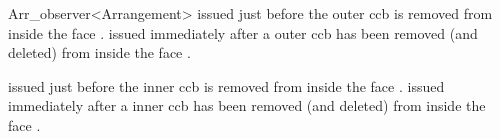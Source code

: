 \begin{ccRefClass}{Arr_observer<Arrangement>}
    {issued just before the outer ccb  is removed from inside the
     face .}
\ccGlue
{}
    {issued immediately after a outer ccb has been removed (and deleted)
     from inside the face .}

    {issued just before the inner ccb  is removed from inside the
     face .}
\ccGlue
{}
    {issued immediately after a inner ccb has been removed (and deleted)
     from inside the face .}

\end{ccRefClass}

\ccRefPageEnd
